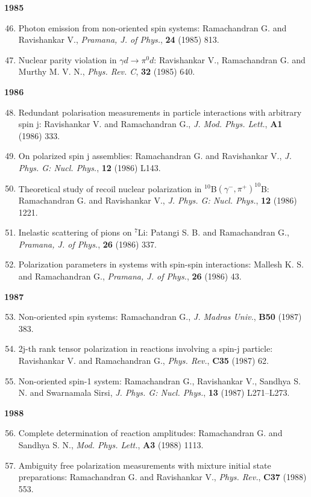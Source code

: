 \textbf{1985}
\begin{enumerate}
\setcounter{enumi}{45}
\item Photon emission from non-oriented spin systems: Ramachandran G. and Ravishankar V., \textit{Pramana, J. of Phys.}, {\bf 24} (1985) 813.
\item Nuclear parity violation in $\gamma d\to \pi^{0}d$: Ravishankar V., Ramachandran G. and Murthy M. V. N., \textit{Phys. Rev. C}, {\bf 32} (1985) 640.
\end{enumerate}
\textbf{1986}
\begin{enumerate}
\setcounter{enumi}{47}
\item Redundant polarisation measurements in particle interactions with arbitrary spin j: Ravishankar V. and Ramachandran G., \textit{J. Mod. Phys. Lett.}, {\bf A1} (1986) 333.
\item On polarized spin j assemblies: Ramachandran G. and Ravishankar V., \textit{J. Phys. G: Nucl. Phys.}, {\bf 12} (1986) L143.
\item Theoretical study of recoil nuclear polarization in $^{10}$B$(\gamma^{-},\pi^{+})^{10}$B: Ramachandran G. and Ravishankar V., \textit{J. Phys. G: Nucl. Phys.}, {\bf 12} (1986) 1221.
\item Inelastic scattering of pions on $^{7}$Li: Patangi S. B. and Ramachandran G., \textit{Pramana, J. of Phys.}, {\bf 26} (1986) 337.
\item Polarization parameters in systems with spin-spin interactions: Mallesh K. S. and Ramachandran G., \textit{Pramana, J. of Phys.}, {\bf 26} (1986) 43.
\end{enumerate}
\textbf{1987}
\begin{enumerate}
\setcounter{enumi}{52}
\item Non-oriented spin systems: Ramachandran G., \textit{J. Madras Univ.}, {\bf B50} (1987) 383.
\item 2j-th rank tensor polarization in reactions involving a spin-j particle: Ravishankar V. and Ramachandran G., \textit{Phys. Rev.}, {\bf C35} (1987) 62.
\item Non-oriented spin-1 system: Ramachandran G., Ravishankar V., Sandhya S. N. and Swarnamala Sirsi, \textit{J. Phys. G: Nucl. Phys.}, {\bf 13} (1987) L271--L273.
\end{enumerate}
\textbf{1988}
\begin{enumerate}
\setcounter{enumi}{55}
\item Complete determination of reaction amplitudes: Ramachandran G. and Sandhya S. N., \textit{Mod. Phys. Lett.}, {\bf A3} (1988) 1113.
\item Ambiguity free polarization measurements with mixture initial state preparations: Ramachandran G. and Ravishankar V., \textit{Phys. Rev.}, {\bf C37} (1988) 553.
\end{enumerate}
